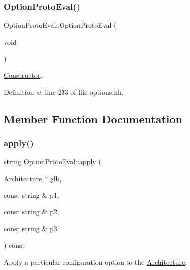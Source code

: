 \subsubsection{\texorpdfstring{OptionProtoEval()}{OptionProtoEval()}}
{\footnotesize\ttfamily Option\+Proto\+Eval\+::\+Option\+Proto\+Eval (\begin{DoxyParamCaption}\item[{void}]{ }\end{DoxyParamCaption})\hspace{0.3cm}{\ttfamily [inline]}}



\mbox{\hyperlink{class_constructor}{Constructor}}. 



Definition at line 233 of file options.\+hh.



\subsection{Member Function Documentation}
\mbox{\label{class_option_proto_eval_a8fd059a29b0abecc4e5f3a9e55661621}} 
\subsubsection{\texorpdfstring{apply()}{apply()}}
{\footnotesize\ttfamily string Option\+Proto\+Eval\+::apply (\begin{DoxyParamCaption}\item[{\mbox{\hyperlink{class_architecture}{Architecture}} $\ast$}]{glb,  }\item[{const string \&}]{p1,  }\item[{const string \&}]{p2,  }\item[{const string \&}]{p3 }\end{DoxyParamCaption}) const\hspace{0.3cm}{\ttfamily [virtual]}}



Apply a particular configuration option to the \mbox{\hyperlink{class_architecture}{Architecture}}. 

